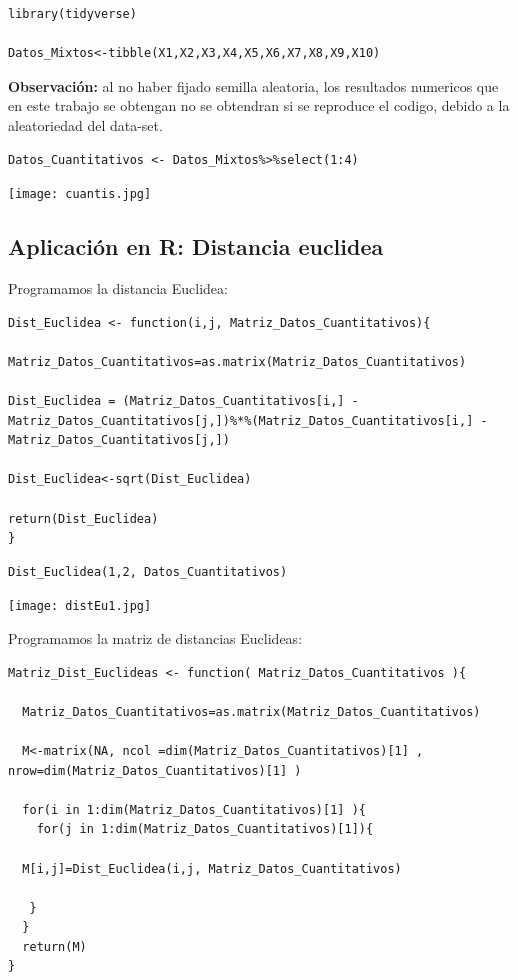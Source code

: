 \documentclass[12pt]{report} %
\begin{document}
 
\begin{lstlisting}
library(tidyverse)
 
Datos_Mixtos<-tibble(X1,X2,X3,X4,X5,X6,X7,X8,X9,X10)
\end{lstlisting}

\textbf{Observación:} al no haber fijado semilla aleatoria, los resultados numericos que en este trabajo se obtengan no se obtendran si se reproduce el codigo, debido a la aleatoriedad del data-set.

\newpage

\begin{lstlisting}
Datos_Cuantitativos <- Datos_Mixtos%>%select(1:4)
\end{lstlisting}


\texttt{[image: cuantis.jpg]}


\subsection{Aplicación en R: Distancia euclidea}


Programamos la  distancia  Euclidea:

\begin{lstlisting}
Dist_Euclidea <- function(i,j, Matriz_Datos_Cuantitativos){

Matriz_Datos_Cuantitativos=as.matrix(Matriz_Datos_Cuantitativos)  
  
Dist_Euclidea = (Matriz_Datos_Cuantitativos[i,] - Matriz_Datos_Cuantitativos[j,])%*%(Matriz_Datos_Cuantitativos[i,] - Matriz_Datos_Cuantitativos[j,])

Dist_Euclidea<-sqrt(Dist_Euclidea)

return(Dist_Euclidea)
}
\end{lstlisting}

\begin{lstlisting}
Dist_Euclidea(1,2, Datos_Cuantitativos)
\end{lstlisting}

\texttt{[image: distEu1.jpg]}

\newpage

Programamos la  matriz de distancias  Euclideas:

\begin{lstlisting}
Matriz_Dist_Euclideas <- function( Matriz_Datos_Cuantitativos ){
  
  Matriz_Datos_Cuantitativos=as.matrix(Matriz_Datos_Cuantitativos)
  
  M<-matrix(NA, ncol =dim(Matriz_Datos_Cuantitativos)[1] , nrow=dim(Matriz_Datos_Cuantitativos)[1] )
  
  for(i in 1:dim(Matriz_Datos_Cuantitativos)[1] ){
    for(j in 1:dim(Matriz_Datos_Cuantitativos)[1]){
    
  M[i,j]=Dist_Euclidea(i,j, Matriz_Datos_Cuantitativos)
  
   }
  }
  return(M)
}
\end{lstlisting}
\end{document}
